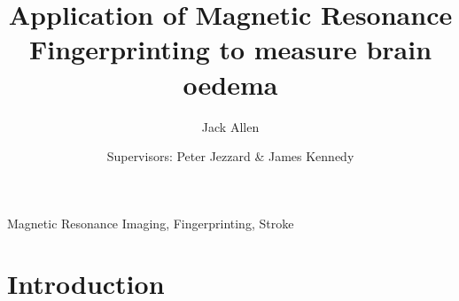 \documentclass[3p, twocolumn]{elsarticle}
\begin{document}
\begin{frontmatter}

\title{Application of Magnetic Resonance Fingerprinting to measure brain oedema}

\author{Jack Allen}
\author{Supervisors: Peter Jezzard \& James Kennedy}
\address{University of Oxford, Oxford, UK.}





\begin{abstract}

\end{abstract}


\begin{keyword}
Magnetic Resonance Imaging, Fingerprinting, Stroke
\end{keyword}

\end{frontmatter}


\section{Introduction}
\end{document}
